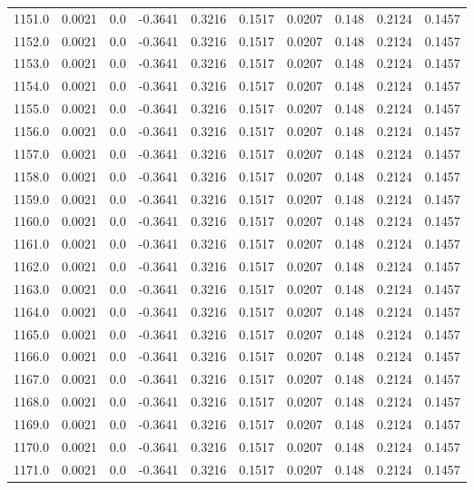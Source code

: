\begin{longtable}{lrrrrrrrrr}
1151.0 & 0.0021 & 0.0 & -0.3641 & 0.3216 & 0.1517 & 0.0207 & 0.148 & 0.2124 & 0.1457 \\
1152.0 & 0.0021 & 0.0 & -0.3641 & 0.3216 & 0.1517 & 0.0207 & 0.148 & 0.2124 & 0.1457 \\
1153.0 & 0.0021 & 0.0 & -0.3641 & 0.3216 & 0.1517 & 0.0207 & 0.148 & 0.2124 & 0.1457 \\
1154.0 & 0.0021 & 0.0 & -0.3641 & 0.3216 & 0.1517 & 0.0207 & 0.148 & 0.2124 & 0.1457 \\
1155.0 & 0.0021 & 0.0 & -0.3641 & 0.3216 & 0.1517 & 0.0207 & 0.148 & 0.2124 & 0.1457 \\
1156.0 & 0.0021 & 0.0 & -0.3641 & 0.3216 & 0.1517 & 0.0207 & 0.148 & 0.2124 & 0.1457 \\
1157.0 & 0.0021 & 0.0 & -0.3641 & 0.3216 & 0.1517 & 0.0207 & 0.148 & 0.2124 & 0.1457 \\
1158.0 & 0.0021 & 0.0 & -0.3641 & 0.3216 & 0.1517 & 0.0207 & 0.148 & 0.2124 & 0.1457 \\
1159.0 & 0.0021 & 0.0 & -0.3641 & 0.3216 & 0.1517 & 0.0207 & 0.148 & 0.2124 & 0.1457 \\
1160.0 & 0.0021 & 0.0 & -0.3641 & 0.3216 & 0.1517 & 0.0207 & 0.148 & 0.2124 & 0.1457 \\
1161.0 & 0.0021 & 0.0 & -0.3641 & 0.3216 & 0.1517 & 0.0207 & 0.148 & 0.2124 & 0.1457 \\
1162.0 & 0.0021 & 0.0 & -0.3641 & 0.3216 & 0.1517 & 0.0207 & 0.148 & 0.2124 & 0.1457 \\
1163.0 & 0.0021 & 0.0 & -0.3641 & 0.3216 & 0.1517 & 0.0207 & 0.148 & 0.2124 & 0.1457 \\
1164.0 & 0.0021 & 0.0 & -0.3641 & 0.3216 & 0.1517 & 0.0207 & 0.148 & 0.2124 & 0.1457 \\
1165.0 & 0.0021 & 0.0 & -0.3641 & 0.3216 & 0.1517 & 0.0207 & 0.148 & 0.2124 & 0.1457 \\
1166.0 & 0.0021 & 0.0 & -0.3641 & 0.3216 & 0.1517 & 0.0207 & 0.148 & 0.2124 & 0.1457 \\
1167.0 & 0.0021 & 0.0 & -0.3641 & 0.3216 & 0.1517 & 0.0207 & 0.148 & 0.2124 & 0.1457 \\
1168.0 & 0.0021 & 0.0 & -0.3641 & 0.3216 & 0.1517 & 0.0207 & 0.148 & 0.2124 & 0.1457 \\
1169.0 & 0.0021 & 0.0 & -0.3641 & 0.3216 & 0.1517 & 0.0207 & 0.148 & 0.2124 & 0.1457 \\
1170.0 & 0.0021 & 0.0 & -0.3641 & 0.3216 & 0.1517 & 0.0207 & 0.148 & 0.2124 & 0.1457 \\
1171.0 & 0.0021 & 0.0 & -0.3641 & 0.3216 & 0.1517 & 0.0207 & 0.148 & 0.2124 & 0.1457 \\

\end{longtable}
